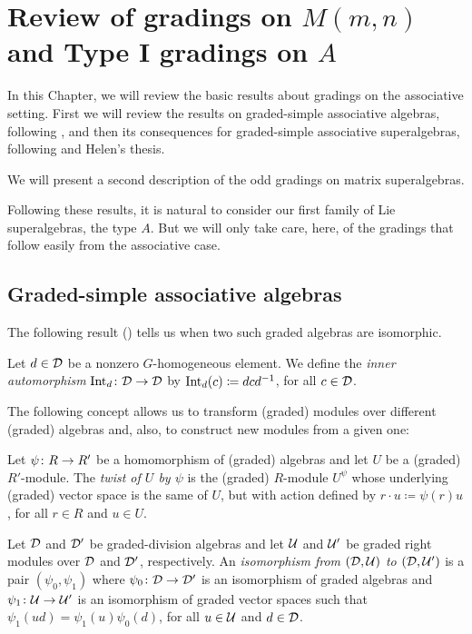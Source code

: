 \chapter{Review of gradings on $M(m,n)$ and Type I gradings on $A$}\label{chap:A-type-I}

In this Chapter, we will review the basic results about gradings on the associative setting. 
First we will review the results on graded-simple associative algebras, following \cite{BK10}, and then its consequences for graded-simple associative superalgebras, following \cite{paper-MAP} and Helen's thesis. 

We will present a second description of the odd gradings on matrix superalgebras.

Following these results, it is natural to consider our first family of Lie superalgebras, the type $A$. 
But we will only take care, here, of the gradings that follow easily from the associative case.


\section{Graded-simple associative algebras}

The following result (\cite[Theorem 2.10]{livromicha}) tells us when two such graded algebras are isomorphic.

\begin{defi}
    Let $d\in \mathcal{D}$ be a nonzero $G$-homogeneous element. 
    We define the \emph{inner automorphism} $\operatorname{Int}_d\colon \mathcal{D} \to \mathcal{D}$ by $\operatorname{Int}_d (c) \coloneqq dcd^{-1}$, for all $c\in \mathcal{D}$.
\end{defi}

The following concept allows us to transform (graded) modules over different (graded) algebras and, also, to construct new modules from a given one:

\begin{defi}\label{def:twist}
    Let $\psi\colon R \to R'$ be a homomorphism of (graded) algebras and let $U$ be a (graded) $R' $-module. 
    The \emph{twist of $U$ by $\psi$} is the (graded) $R$-module $U^{\psi}$ whose underlying (graded) vector space is the same of $U$, but with action defined by $r \cdot u \coloneqq \psi(r)u$, for all $r\in R$ and $u\in U$.
\end{defi}

\begin{defi}
    Let $\mathcal{D}$ and $\mathcal{D}'$ be graded-division algebras and let $\mathcal U$ and $\mathcal U'$ be graded right modules over $\mathcal{D}$ and $\mathcal{D}'$, respectively. 
    An \emph{isomorphism from $(\mathcal{D}, \mathcal U)$ to $(\mathcal{D}, \mathcal U')$} is a pair $(\psi_0, \psi_1)$ where $\psi_0\colon \mathcal{D} \to \mathcal{D}'$ is an isomorphism of graded algebras and $\psi_1\colon \mathcal U \to \mathcal U'$ is an isomorphism of graded vector spaces such that $\psi_1(ud) = \psi_1(u) \psi_0(d)$, for all $u\in \mathcal U$ and $d \in \mathcal{D}$. 
\end{defi}


